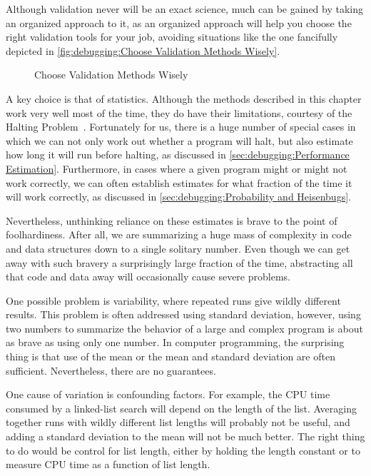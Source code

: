 Although validation never will be an exact science, much can be gained
by taking an organized approach to it, as an organized approach will
help you choose the right validation tools for your job, avoiding
situations like the one fancifully depicted in
\cref{fig:debugging:Choose Validation Methods Wisely}.

\begin{figure}
\centering
{}
\caption{Choose Validation Methods Wisely}
\end{figure}

A key choice is that of statistics.
Although the methods described in this chapter work very well most of
the time, they do have their limitations, courtesy of the Halting
Problem~\cite{AlanMTuring1937HaltingProblem,GeoffreyKPullum2000HaltingProblem}.
Fortunately for us, there is a huge number of special cases in which
we can not only work out whether a program will halt, but also
estimate how long it will run before halting, as discussed in
\cref{sec:debugging:Performance Estimation}.
Furthermore, in cases where a given program might or might not work
correctly, we can often establish estimates for what fraction of the
time it will work correctly, as discussed in
\cref{sec:debugging:Probability and Heisenbugs}.

Nevertheless, unthinking reliance on these estimates is brave to the
point of foolhardiness.
After all, we are summarizing a huge mass of complexity in code and
data structures down to a single solitary number.
Even though we can get away with such bravery a surprisingly large
fraction of the time, abstracting all that code and data away will
occasionally cause severe problems.

One possible problem is variability, where repeated runs give wildly
different results.
This problem is often addressed using standard deviation, however, using
two numbers to summarize the behavior of a large and complex program is
about as brave as using only one number.
In computer programming, the surprising thing is that use of the
mean or the mean and standard deviation are often sufficient.
Nevertheless, there are no guarantees.

One cause of variation is confounding factors.
For example, the CPU time consumed by a linked-list search will depend
on the length of the list.
Averaging together runs with wildly different list lengths will
probably not be useful, and adding a standard deviation to the mean
will not be much better.
The right thing to do would be control for list length, either by
holding the length constant or to measure CPU time as a function of
list length.

